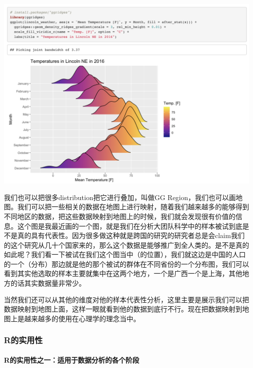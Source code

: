 \documentclass[
  oneside]{book}
\begin{document}
\includegraphics{1001-lesson1/image-20230302201322126.png}

我们也可以把很多distribution把它进行叠加，叫做GG
Region，我们也可以画地图。我们可以把一些相关的数据在地图上进行映射，随着我们越来越多的能够得到不同地区的数据，把这些数据映射到地图上的时候，我们就会发现很有价值的信息。这个图是我最近画的一个图，就是我们在分析大团队科学中的样本被试到底是不是真的具有代表性。因为很多做这种就是跨国的研究的研究者总是会claim我们的这个研究从几十个国家来的，那么这个数据是能够推广到全人类的。是不是真的如此呢？我们看一下被试在我们这个图当中（的位置），我们就这边是中国的人口的一个（分布）那边就是他的那个被试的群体在不同省份的一个分布图，我们可以看到其实他选取的样本主要就集中在这两个地方，一个是广西一个是上海，其他地方的话其实数据量非常少。

当然我们还可以从其他的维度对他的样本代表性分析，这里主要是展示我们可以把数据映射到地图上面，这样一眼就看到他的数据到底行不行。现在把数据映射到地图上是越来越多的使用在心理学的理念当中。

\hypertarget{rux7684ux5b9eux7528ux6027}{%
\subsubsection{R的实用性}\label{rux7684ux5b9eux7528ux6027}}

\hypertarget{rux7684ux5b9eux7528ux6027ux4e4bux4e00ux9002ux7528ux4e8eux6570ux636eux5206ux6790ux7684ux5404ux4e2aux9636ux6bb5}{%
\paragraph{R的实用性之一：适用于数据分析的各个阶段}\label{rux7684ux5b9eux7528ux6027ux4e4bux4e00ux9002ux7528ux4e8eux6570ux636eux5206ux6790ux7684ux5404ux4e2aux9636ux6bb5}}
\end{document}

